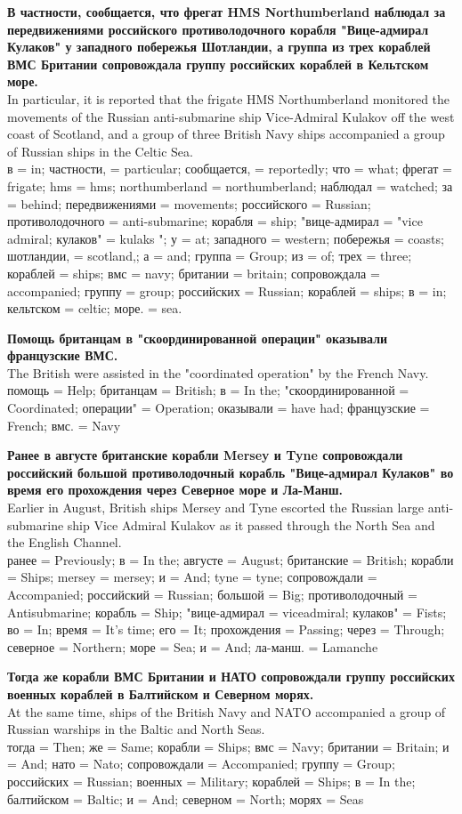 {\bf В частности, сообщается, что фрегат HMS Northumberland наблюдал за передвижениями российского противолодочного корабля "Вице-адмирал Кулаков" у западного побережья Шотландии, а группа из трех кораблей ВМС Британии сопровождала группу российских кораблей в Кельтском море. }\\
In particular, it is reported that the frigate HMS Northumberland monitored the movements of the Russian anti-submarine ship Vice-Admiral Kulakov off the west coast of Scotland, and a group of three British Navy ships accompanied a group of Russian ships in the Celtic Sea.\\
{\color{darkgreen} в = in; частности, = particular; сообщается, = reportedly; что = what; фрегат = frigate; hms = hms; northumberland = northumberland; наблюдал = watched; за = behind; передвижениями = movements; российского = Russian; противолодочного = anti-submarine; корабля = ship; "вице-адмирал = "vice admiral; кулаков" = kulaks "; у = at; западного = western; побережья = coasts; шотландии, = scotland,; а = and; группа = Group; из = of; трех = three; кораблей = ships; вмс = navy; британии = britain; сопровождала = accompanied; группу = group; российских = Russian; кораблей = ships; в = in; кельтском = celtic; море. = sea.}

{\bf Помощь британцам в "скоординированной операции" оказывали французские ВМС. }\\
The British were assisted in the "coordinated operation" by the French Navy. \\
{\color{darkgreen} помощь = Help; британцам = British; в = In the; "скоординированной = Coordinated; операции" = Operation; оказывали = have had; французские = French; вмс. = Navy}

{\bf Ранее в августе британские корабли Mersey и Tyne сопровождали российский большой противолодочный корабль "Вице-адмирал Кулаков" во время его прохождения через Северное море и Ла-Манш. }\\
Earlier in August, British ships Mersey and Tyne escorted the Russian large anti-submarine ship Vice Admiral Kulakov as it passed through the North Sea and the English Channel. \\
{\color{darkgreen} ранее = Previously; в = In the; августе = August; британские = British; корабли = Ships; mersey = mersey; и = And; tyne = tyne; сопровождали = Accompanied; российский = Russian; большой = Big; противолодочный = Antisubmarine; корабль = Ship; "вице-адмирал = viceadmiral; кулаков" = Fists; во = In; время = It's time; его = It; прохождения = Passing; через = Through; северное = Northern; море = Sea; и = And; ла-манш. = Lamanche}

{\bf Тогда же корабли ВМС Британии и НАТО сопровождали группу российских военных кораблей в Балтийском и Северном морях.}\\
At the same time, ships of the British Navy and NATO accompanied a group of Russian warships in the Baltic and North Seas.\\
{\color{darkgreen} тогда = Then; же = Same; корабли = Ships; вмс = Navy; британии = Britain; и = And; нато = Nato; сопровождали = Accompanied; группу = Group; российских = Russian; военных = Military; кораблей = Ships; в = In the; балтийском = Baltic; и = And; северном = North; морях = Seas}

